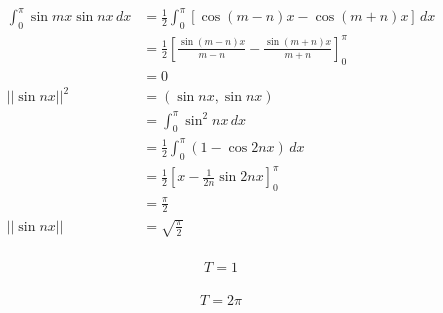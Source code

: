 \documentclass{article}
\begin{document}
\setcounter{subsubsection}{8}
\subsubsection{}

\begin{align*}
  \int_0^\pi \sin m x \sin n x \,d x & = \frac{1}{2} \int_0^\pi [\cos (m - n) x - \cos (m + n) x] \,d x                               \\
                                     & = \frac{1}{2} \left[ \frac{\sin (m - n) x}{m - n} - \frac{\sin (m + n) x}{m + n} \right]_0^\pi \\
                                     & = 0                                                                                            \\
  ||\sin n x||^2                     & = (\sin n x, \sin n x)                                                                         \\
                                     & = \int_0^\pi \sin^2 n x \,d x                                                                  \\
                                     & = \frac{1}{2} \int_0^\pi (1 - \cos 2 n x) \,d x                                                \\
                                     & = \frac{1}{2} \left[ x - \frac{1}{2 n} \sin 2 n x \right]_0^\pi                                \\
                                     & = \frac{\pi}{2}                                                                                \\
  ||\sin n x||                       & = \sqrt{\frac{\pi}{2}}
\end{align*}

\setcounter{subsubsection}{20}
\subsubsection{}

\[T = 1\]

\setcounter{subsubsection}{22}
\subsubsection{}

\[T = 2 \pi\]

\setcounter{subsubsection}{24}
\subsubsection{}
\end{document}
